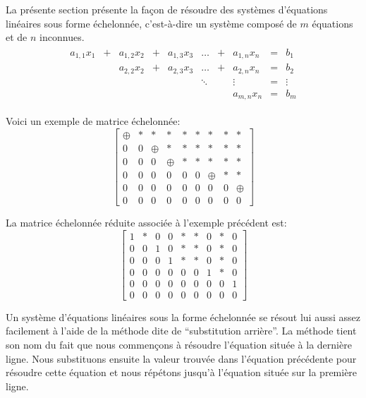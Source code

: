 \documentclass[]{book}
\theoremstyle{definition}
\theoremstyle{definition}
\theoremstyle{definition}
\theoremstyle{remark}
\begin{document}
La présente section présente la façon de résoudre des systèmes d'équations linéaires sous forme échelonnée, c'est-à-dire un système composé de \(m\) équations et de \(n\) inconnues.
\begin{align*}
\begin{array}{cccccccccc}
a_{1,1}x_1 & +& a_{1,2}x_2 & +&  a_{1,3}x_3 & \ldots & +&  a_{1,n}x_n & =& b_1  \\
        & & a_{2,2}x_2 & +&  a_{2,3}x_3 & \ldots & +& a_{2,n}x_n & =& b_2  \\
        & &         & &    & \ddots & & \vdots & =& \vdots   \\
       & &         & &          &        & & a_{m,n}x_n & =& b_m
\end{array}
\end{align*}

Voici un exemple de matrice échelonnée:
\[ \begin{bmatrix}
\oplus & * & * & * & * & * & * & * & * \\
0 & 0 & \oplus & * & * & * & * & * & * \\
0 & 0 & 0 & \oplus & * & * & * & * & * \\ 
0 & 0 & 0 & 0 & 0 & 0 & \oplus & * & * \\ 
0 & 0 & 0 & 0 & 0 & 0 & 0 & 0 & \oplus \\ 
0 & 0 & 0 & 0 & 0 & 0 & 0 & 0 & 0 
\end{bmatrix} \]

La matrice échelonnée réduite associée à l'exemple précédent est:
\[\begin{bmatrix}
1 & * & 0 & 0 & * & * & 0 & * & 0 \\
0 & 0 & 1 & 0 & * & * & 0 & * & 0 \\
0 & 0 & 0 & 1 & * & * & 0 & * & 0 \\ 
0 & 0 & 0 & 0 & 0 & 0 & 1 & * & 0 \\ 
0 & 0 & 0 & 0 & 0 & 0 & 0 & 0 & 1 \\ 
0 & 0 & 0 & 0 & 0 & 0 & 0 & 0 & 0 
\end{bmatrix} \]

Un système d'équations linéaires sous la forme échelonnée se résout lui aussi assez facilement à l'aide de la méthode dite de ``substitution arrière''. La méthode tient son nom du fait que nous commençons à résoudre l'équation située à la dernière ligne. Nous substituons ensuite la valeur trouvée dans l'équation précédente pour résoudre cette équation et nous répétons jusqu'à l'équation située sur la première ligne.
\end{document}
